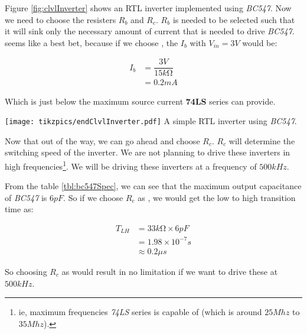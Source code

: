 \documentclass[../../main]{subfiles}
\begin{document}
\begin{center}
    {\begin{minipage} [c] {0.55\textwidth}
        Figure \ref{fig:clvlInverter} shows an RTL inverter implemented using \emph{BC547}.
        Now we need to choose the resisters $\si{R}_{b}$ and $\si{R}_{c}$. $\si{R}_{b}$
        is needed to be selected such that it will sink only the necessary amount of current
        that is needed to drive \emph{BC547}. \resValOneFiveK{} seems like a best bet, because if we
        choose \resValOneFiveK{}, the $\si{I}_{b}$ with $\si{V}_{in} = 3\si{V}$ would
        be:

        \begin{align}
            \si{I}_{b} &= \dfrac{3 \si{V}}{15\si{k \ohm}} \\
            &= 0.2 \si{mA}
        \end{align}

        Which is just below the maximum source current \textbf{74LS} series can provide.

    \end{minipage}
    \hfill
    \begin{minipage} [c] {0.35\textwidth}
        \centering
        \texttt{[image: tikzpics/endClvlInverter.pdf]}
         {A simple RTL inverter using \emph{BC547}.}
        \label{fig:clvlInverter}
    \end{minipage}\hfill}
\end{center}


Now that out of the way, we can go ahead and choose $\si{R}_{c}$. $\si{R}_{c}$ will determine the
switching speed of the inverter. We are not planning to drive these inverters in high
frequencies\footnote{ie, maximum frequencies \emph{74LS} series is capable of (which is
around $25\si{Mhz}$ to $35\si{Mhz}$).}. We will be driving these inverters at a frequency
of $500\si{kHz}$.

From the table \ref{tbl:bc547Spec}, we can see that the maximum output capacitance of \emph{BC547}
is $6 \si{pF}$. So if we choose $\si{R}_{c}$ as \resValThreeThreeK{}, we would get the low to
high transition time as:

\begin{align}
    T_{LH} &= 33\si{k \ohm} \times 6 \si{pF} \\
    &= 1.98 \times 10^{-7} \si{s} \\
    &\approx 0.2 \si{\mu s}
\end{align}

So choosing $\si{R}_{c}$ as \resValThreeThreeK{} would result in no limitation if we want to drive
these at $500\si{kHz}$.

\end{document}
